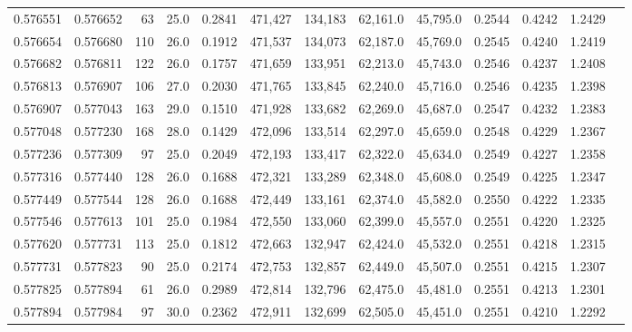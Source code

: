 \begin{tabular}{rrrrrrrrrrrrr}
0.576551 & 0.576652 &    63 & 25.0 &                                     0.2841 & 471,427 & 134,183 &  62,161.0 &  45,795.0 & 0.2544 & 0.4242 & 1.2429 \\
0.576654 & 0.576680 &   110 & 26.0 &                                     0.1912 & 471,537 & 134,073 &  62,187.0 &  45,769.0 & 0.2545 & 0.4240 & 1.2419 \\
0.576682 & 0.576811 &   122 & 26.0 &                                     0.1757 & 471,659 & 133,951 &  62,213.0 &  45,743.0 & 0.2546 & 0.4237 & 1.2408 \\
0.576813 & 0.576907 &   106 & 27.0 &                                     0.2030 & 471,765 & 133,845 &  62,240.0 &  45,716.0 & 0.2546 & 0.4235 & 1.2398 \\
0.576907 & 0.577043 &   163 & 29.0 &                                     0.1510 & 471,928 & 133,682 &  62,269.0 &  45,687.0 & 0.2547 & 0.4232 & 1.2383 \\
0.577048 & 0.577230 &   168 & 28.0 &                                     0.1429 & 472,096 & 133,514 &  62,297.0 &  45,659.0 & 0.2548 & 0.4229 & 1.2367 \\
0.577236 & 0.577309 &    97 & 25.0 &                                     0.2049 & 472,193 & 133,417 &  62,322.0 &  45,634.0 & 0.2549 & 0.4227 & 1.2358 \\
0.577316 & 0.577440 &   128 & 26.0 &                                     0.1688 & 472,321 & 133,289 &  62,348.0 &  45,608.0 & 0.2549 & 0.4225 & 1.2347 \\
0.577449 & 0.577544 &   128 & 26.0 &                                     0.1688 & 472,449 & 133,161 &  62,374.0 &  45,582.0 & 0.2550 & 0.4222 & 1.2335 \\
0.577546 & 0.577613 &   101 & 25.0 &                                     0.1984 & 472,550 & 133,060 &  62,399.0 &  45,557.0 & 0.2551 & 0.4220 & 1.2325 \\
0.577620 & 0.577731 &   113 & 25.0 &                                     0.1812 & 472,663 & 132,947 &  62,424.0 &  45,532.0 & 0.2551 & 0.4218 & 1.2315 \\
0.577731 & 0.577823 &    90 & 25.0 &                                     0.2174 & 472,753 & 132,857 &  62,449.0 &  45,507.0 & 0.2551 & 0.4215 & 1.2307 \\
0.577825 & 0.577894 &    61 & 26.0 &                                     0.2989 & 472,814 & 132,796 &  62,475.0 &  45,481.0 & 0.2551 & 0.4213 & 1.2301 \\
0.577894 & 0.577984 &    97 & 30.0 &                                     0.2362 & 472,911 & 132,699 &  62,505.0 &  45,451.0 & 0.2551 & 0.4210 & 1.2292 \\

\end{tabular}
